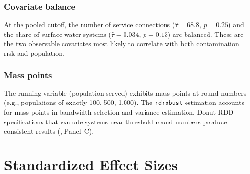 \documentclass[12pt]{article}
\begin{document}
\subsubsection*{Covariate balance} At the pooled cutoff, the number of service connections ($\hat{\tau} = 68.8$, $p = 0.25$) and the share of surface water systems ($\hat{\tau} = 0.034$, $p = 0.13$) are balanced. These are the two observable covariates most likely to correlate with both contamination risk and population.

\subsubsection*{Mass points} The running variable (population served) exhibits mass points at round numbers (e.g., populations of exactly 100, 500, 1,000). The \texttt{rdrobust} estimation accounts for mass points in bandwidth selection and variance estimation. Donut RDD specifications that exclude systems near threshold round numbers produce consistent results (, Panel~C).


\section{Standardized Effect Sizes}
\label{sec:sde}


\end{document}
